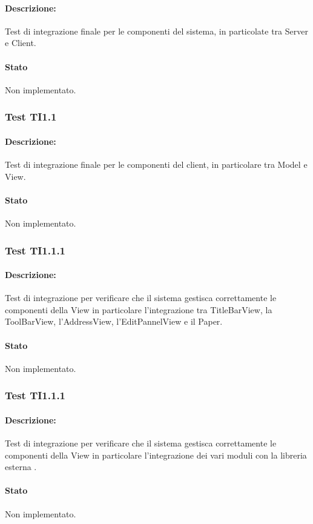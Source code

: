 \documentclass[../PianoDiQualifica.tex]{subfiles}
\begin{document}
	\paragraph{Descrizione:} Test di integrazione finale per le componenti del sistema, in particolate tra Server e Client.
	\paragraph{Stato} Non implementato.
	
	\subsubsection{Test TI1.1}
	\paragraph{Descrizione:} Test di integrazione finale per le componenti del client, in particolare tra  Model e View.
	\paragraph{Stato} Non implementato.
	\subsubsection{Test TI1.1.1}
	\paragraph{Descrizione:} Test di integrazione per verificare che il sistema gestisca correttamente le componenti della View in particolare l'integrazione tra TitleBarView, la ToolBarView, l'AddressView, l'EditPannelView e il Paper.
	\paragraph{Stato} Non implementato.
	
	
	\subsubsection{Test TI1.1.1}
	\paragraph{Descrizione:} Test di integrazione per verificare che il sistema gestisca correttamente le componenti della View in particolare l'integrazione dei vari moduli con la libreria esterna  . %
	\paragraph{Stato} Non implementato.
	
\end{document}
